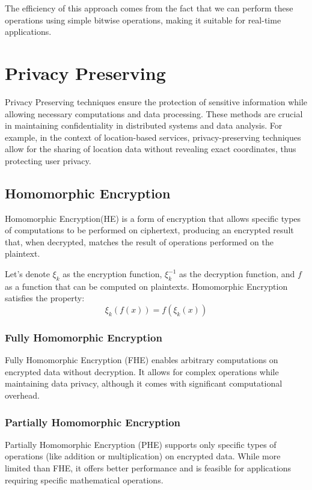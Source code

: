 \documentclass[12pt,a4paper,twoside]{book}
\begin{document}
The efficiency of this approach comes from the fact that we can perform these operations using simple bitwise operations, making it suitable for real-time applications.


\section{Privacy Preserving}
Privacy Preserving techniques ensure the protection of sensitive information while allowing necessary computations and data processing. These methods are crucial in maintaining confidentiality in distributed systems and data analysis. For example, in the context of location-based services, privacy-preserving techniques allow for the sharing of location data without revealing exact coordinates, thus protecting user privacy.

\subsection{Homomorphic Encryption}
Homomorphic Encryption(HE) is a form of encryption that allows specific types of computations to be performed on ciphertext, producing an encrypted result that, when decrypted, matches the result of operations performed on the plaintext.

Let's denote \( \xi_k \) as the encryption function, \( \xi_k^{-1} \) as the decryption function, and \( f \) as a function that can be computed on plaintexts. Homomorphic Encryption satisfies the property:
\[
    \xi_k(f(x)) = f(\xi_k(x))
\]

\subsubsection{Fully Homomorphic Encryption}
Fully Homomorphic Encryption (FHE) enables arbitrary computations on encrypted data without decryption. It allows for complex operations while maintaining data privacy, although it comes with significant computational overhead.

\subsubsection{Partially Homomorphic Encryption}
Partially Homomorphic Encryption (PHE) supports only specific types of operations (like addition or multiplication) on encrypted data. While more limited than FHE, it offers better performance and is feasible for applications requiring specific mathematical operations.
\end{document}
